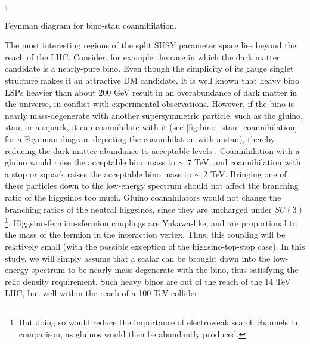 \begin{marginfigure}
  ;
\caption{Feynman diagram for bino-stau coannihilation.}
\label{fig:bino_stau_coannihilation}
\end{marginfigure}

The most interesting regions of the split SUSY parameter space lies beyond the reach of the LHC. Consider, for example the case in which the dark matter candidate is a nearly-pure bino. Even though the simplicity of its gauge singlet structure makes it an attractive DM candidate, It is well known that heavy bino LSPs heavier than about 200 GeV result in an overabundance of dark matter in the universe, in conflict with experimental observations. However, if the bino is nearly mass-degenerate with another supersymmetric particle, such as the gluino, stau, or a squark, it can coannihilate with it (see \autoref{fig:bino_stau_coannihilation} for a Feynman diagram depicting the coannihilation with a stau), thereby reducing the dark matter abundance to acceptable levels \cite{Griest:1990kh}. Coannihilation with a gluino would raise the acceptable bino mass to $\sim$ 7 TeV, and coannihilation with a stop or squark raises the acceptable bino mass to $\sim$ 2 TeV. Bringing one of these particles down to the low-energy spectrum should not affect the branching ratio of the higgsinos too much. Gluino coannhilators would not change the branching ratios of the neutral higgsinos, since they are uncharged under $SU(3)$\footnote{But doing so would reduce the importance of electroweak search channels in comparison, as gluinos would then be abundantly produced.}. Higgsino-fermion-sfermion couplings are Yukawa-like, and are proportional to the mass of the fermion in the interaction vertex. Thus, this coupling will be relatively small (with the possible exception of the higgsino-top-stop case). In this study, we will simply assume that a scalar can be brought down into the low-energy spectrum to be nearly mass-degenerate with the bino, thus satisfying the relic density requirement. Such heavy binos are out of the reach of the 14 TeV LHC, but well within the reach of a 100 TeV collider.


